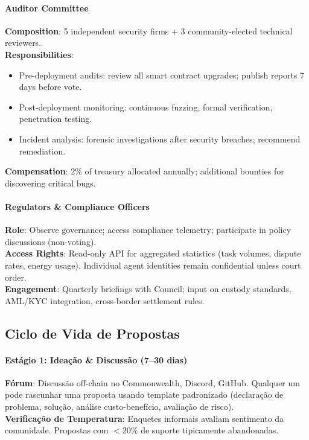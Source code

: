 \documentclass[11pt]{article}
\begin{document}
\begin{itemize}[noitemsep]
\begin{itemize}[noitemsep]
\begin{itemize}[noitemsep]
\paragraph{Auditor Committee}
\textbf{Composition}: 5 independent security firms + 3 community-elected technical reviewers.\\
\textbf{Responsibilities}:
\begin{itemize}[noitemsep]
  \item Pre-deployment audits: review all smart contract upgrades; publish reports 7 days before vote.
  \item Post-deployment monitoring: continuous fuzzing, formal verification, penetration testing.
  \item Incident analysis: forensic investigations after security breaches; recommend remediation.
\end{itemize}
\textbf{Compensation}: 2\% of treasury allocated annually; additional bounties for discovering critical bugs.

\paragraph{Regulators \& Compliance Officers}
\textbf{Role}: Observe governance; access compliance telemetry; participate in policy discussions (non-voting).\\
\textbf{Access Rights}: Read-only API for aggregated statistics (task volumes, dispute rates, energy usage). Individual agent identities remain confidential unless court order.\\
\textbf{Engagement}: Quarterly briefings with Council; input on custody standards, AML/KYC integration, cross-border settlement rules.

\subsection{Ciclo de Vida de Propostas}

\paragraph{Estágio 1: Ideação \& Discussão (7--30 dias)}
\textbf{Fórum}: Discussão off-chain no Commonwealth, Discord, GitHub. Qualquer um pode rascunhar uma proposta usando template padronizado (declaração de problema, solução, análise custo-benefício, avaliação de risco).\\
\textbf{Verificação de Temperatura}: Enquetes informais avaliam sentimento da comunidade. Propostas com $<20\%$ de suporte tipicamente abandonadas.


\end{itemize}
\end{itemize}
\end{itemize}
\end{document}
